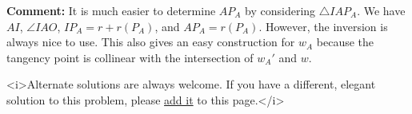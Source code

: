\begin{enumerate}
 \textbf{Comment:} It is much easier to determine $AP_{A}$ by considering $\triangle IAP_{A}$. We have $AI$, $\angle IAO$, $IP_{A}=r+r(P_{A})$, and $AP_{A}=r(P_{A})$. However, the inversion is always nice to use. This also gives an easy construction for $w_{A}$ because the tangency point is collinear with the intersection of $w_{A}'$ and $w$.

 <i>Alternate solutions are always welcome. If you have a different, elegant solution to this problem, please \href{https://artofproblemsolving.com/wiki/index.php?title=2007\_USAMO\_Problems/Problem\_6&action=edit}{add it} to this page.</i>



\end{enumerate}